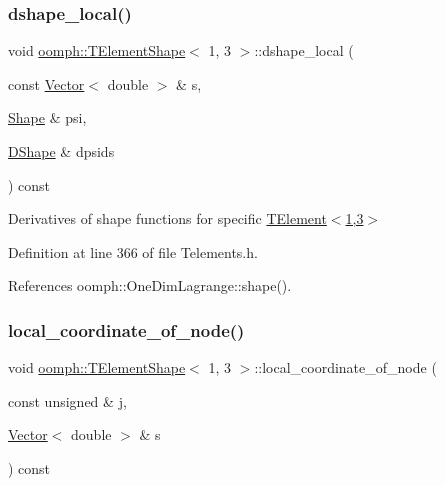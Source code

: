 \mbox{\label{classoomph_1_1TElementShape_3_011_00_013_01_4_a47bfa41ceb5f7df0b6ba774c653a9ea3}} 
\subsubsection{\texorpdfstring{dshape\+\_\+local()}{dshape\_local()}}
{\footnotesize\ttfamily void \hyperlink{classoomph_1_1TElementShape}{oomph\+::\+T\+Element\+Shape}$<$ 1, 3 $>$\+::dshape\+\_\+local (\begin{DoxyParamCaption}\item[{const \hyperlink{classoomph_1_1Vector}{Vector}$<$ double $>$ \&}]{s,  }\item[{\hyperlink{classoomph_1_1Shape}{Shape} \&}]{psi,  }\item[{\hyperlink{classoomph_1_1DShape}{D\+Shape} \&}]{dpsids }\end{DoxyParamCaption}) const\hspace{0.3cm}{\ttfamily [inline]}}



Derivatives of shape functions for specific \hyperlink{classoomph_1_1TElement}{T\+Element$<$1,3$>$} 



Definition at line 366 of file Telements.\+h.



References oomph\+::\+One\+Dim\+Lagrange\+::shape().

\mbox{\label{classoomph_1_1TElementShape_3_011_00_013_01_4_a08e97f9735505002c27e524d86371e5b}} 
\subsubsection{\texorpdfstring{local\+\_\+coordinate\+\_\+of\+\_\+node()}{local\_coordinate\_of\_node()}}
{\footnotesize\ttfamily void \hyperlink{classoomph_1_1TElementShape}{oomph\+::\+T\+Element\+Shape}$<$ 1, 3 $>$\+::local\+\_\+coordinate\+\_\+of\+\_\+node (\begin{DoxyParamCaption}\item[{const unsigned \&}]{j,  }\item[{\hyperlink{classoomph_1_1Vector}{Vector}$<$ double $>$ \&}]{s }\end{DoxyParamCaption}) const\hspace{0.3cm}{\ttfamily [inline]}}



